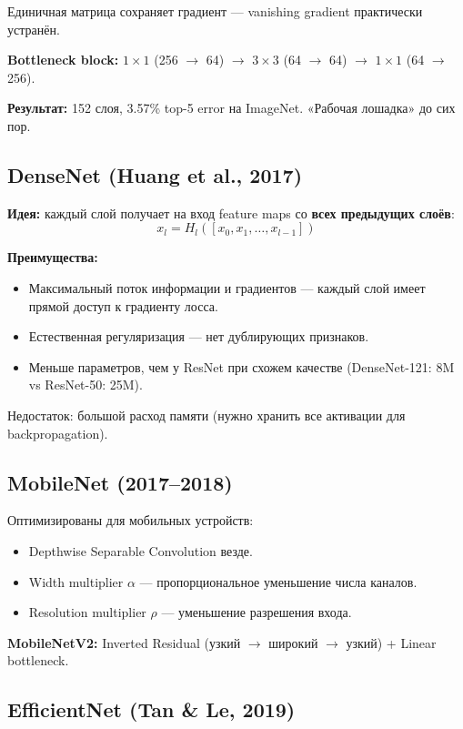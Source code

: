 \documentclass[a4paper,12pt]{article}
\begin{document}
Единичная матрица сохраняет градиент — vanishing gradient практически устранён.

\textbf{Bottleneck block:} $1\times1$ (256 $\to$ 64) $\to$ $3\times3$ (64 $\to$ 64) $\to$ $1\times1$ (64 $\to$ 256).

\textbf{Результат:} 152 слоя, 3.57\% top-5 error на ImageNet. «Рабочая лошадка» до сих пор.

\subsection{DenseNet (Huang et al., 2017)}

\textbf{Идея:} каждый слой получает на вход feature maps со \textbf{всех предыдущих слоёв}:
\[
x_l = H_l([x_0, x_1, \dots, x_{l-1}])
\]

\textbf{Преимущества:}
\begin{itemize}
    \item Максимальный поток информации и градиентов — каждый слой имеет прямой доступ к градиенту лосса.
    \item Естественная регуляризация — нет дублирующих признаков.
    \item Меньше параметров, чем у ResNet при схожем качестве (DenseNet-121: 8M vs ResNet-50: 25M).
\end{itemize}

Недостаток: большой расход памяти (нужно хранить все активации для backpropagation).

\subsection{MobileNet (2017--2018)}

Оптимизированы для мобильных устройств:
\begin{itemize}
    \item Depthwise Separable Convolution везде.
    \item Width multiplier $\alpha$ — пропорциональное уменьшение числа каналов.
    \item Resolution multiplier $\rho$ — уменьшение разрешения входа.
\end{itemize}

\textbf{MobileNetV2:} Inverted Residual (узкий $\to$ широкий $\to$ узкий) + Linear bottleneck.

\subsection{EfficientNet (Tan \& Le, 2019)}
\end{document}
